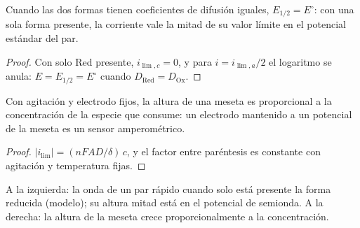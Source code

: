 \begin{corollary}\label{cor:b2:current-potential-curves:half-wave}
Cuando las dos formas tienen coeficientes de difusión iguales, $E_{1/2} = E^\circ$: con
una sola forma presente, la corriente vale la mitad de su valor límite en el potencial
estándar del par.
\end{corollary}

\begin{proof}
Con solo Red presente, $i_{\lim,c} = 0$, y para $i = i_{\lim,a}/2$ el logaritmo
se anula: $E = E_{1/2} = E^\circ$ cuando $D_{\text{Red}} = D_{\text{Ox}}$.
\end{proof}

\begin{proposition}\label{prop:b2:current-potential-curves:plateau}
Con agitación y electrodo fijos, la altura de una meseta es proporcional a la
concentración de la especie que consume: un electrodo mantenido a un
potencial de la meseta es un sensor amperométrico.
\end{proposition}

\begin{proof}
$|i_{\lim}| = (nFAD/\delta)\,c$, y el factor entre paréntesis es constante con agitación
y temperatura fijas.
\end{proof}

\begin{omfigure}
\hfill
{}

{\small A la izquierda: la onda de un par rápido cuando solo está presente la forma reducida
(modelo); su altura mitad está en el potencial de semionda. A la derecha: la altura de la
meseta crece proporcionalmente a la concentración.}
\end{omfigure}


